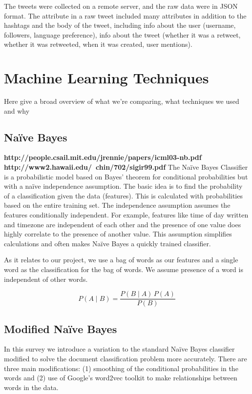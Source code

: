 \documentclass[11pt,letterpaper]{article}
\begin{document}
The tweets were collected on a remote server, and the raw data were in JSON format. The attribute in a raw tweet included many attributes in addition to the hashtags and the body of the tweet, including info about the user (username, followers, language preference), info about the tweet (whether it was a retweet, whether it was retweeted, when it was created, user mentions).

\section{Machine Learning Techniques}
Here give a broad overview of what we're comparing, what techniques we used and why

\subsection{Na{\"i}ve Bayes}
\textbf{http://people.csail.mit.edu/jrennie/papers/icml03-nb.pdf} \textbf{http://www2.hawaii.edu/~chin/702/sigir99.pdf}
  The Na{\"i}ve Bayes Classifier is a probabilistic model based on Bayes' theorem for conditional probabilities but with a na{\"i}ve independence assumption. The basic idea is to find the probability of a classification given the data  (features). This is calculated with probabilities based on the entire training set. The independence assumption assumes the features conditionally independent. For example, features like time of day written and timezone are independent of each other and the presence of one value does highly correlate to the presence of another value. This assumption simplifies calculations and often makes Na{\"i}ve Bayes a quickly trained classifier.

As it relates to our project, we use a bag of words as our features and a single word as the classification for the bag of words. We assume presence of a word is independent of other words. 

$$ P(A \mid B) = \frac{P(B \mid A) \, P(A)}{P(B)} $$


\subsection{Modified Na{\"i}ve Bayes}
In this survey we introduce a variation to the standard Na{\"i}ve Bayes classifier modified to solve the document classification problem more accurately. There are three main modifications: (1) smoothing of the conditional probabilities in the words and (2) use of Google's word2vec toolkit to make relationships between words in the data.
\end{document}
